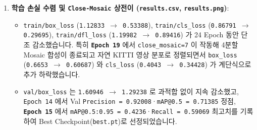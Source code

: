 \documentclass[10.5pt,a4paper]{article}
\begin{document}
\begin{enumerate}[leftmargin=1.8em,itemsep=2pt]
\item \textbf{학습 손실 수렴 및 \texttt{Close-\allowbreak{}Mosaic} 상전이 (\texttt{results.\allowbreak{}csv}, \texttt{results.\allowbreak{}png})}:
\begin{itemize}[leftmargin=1.5em,itemsep=2pt]
\item \texttt{train/\allowbreak{}box\_\allowbreak{}loss} (\texttt{1.\allowbreak{}12833 $\rightarrow$ 0.\allowbreak{}53388}), \texttt{train/\allowbreak{}cls\_\allowbreak{}loss} (\texttt{0.\allowbreak{}86791 $\rightarrow$ 0.\allowbreak{}29695}), \texttt{train/\allowbreak{}dfl\_\allowbreak{}loss} (\texttt{1.\allowbreak{}19982 $\rightarrow$ 0.\allowbreak{}89416}) 가 24 Epoch 동안 단조 감소했습니다. 특히 \textbf{\texttt{Epoch 19}} 에서 \texttt{close\_\allowbreak{}mosaic=7} 이 작동해 4분할 Mosaic 합성이 종료되고 자연 KITTI 영상 분포로 정렬되면서 \texttt{box\_\allowbreak{}loss} (\texttt{0.\allowbreak{}6653 $\rightarrow$ 0.\allowbreak{}60687}) 와 \texttt{cls\_\allowbreak{}loss} (\texttt{0.\allowbreak{}4043 $\rightarrow$ 0.\allowbreak{}34428}) 가 계단식으로 추가 하락했습니다.
\item \texttt{val/\allowbreak{}box\_\allowbreak{}loss} 는 \texttt{1.\allowbreak{}60946 $\rightarrow$ 1.\allowbreak{}29238} 로 과적합 없이 지속 감소했고, \texttt{Epoch 14} 에서 Val \texttt{Precision = 0.\allowbreak{}92008}·\texttt{mAP@0.\allowbreak{}5 = 0.\allowbreak{}71385} 정점, \textbf{\texttt{Epoch 15}} 에서 \texttt{mAP@0.\allowbreak{}5:\allowbreak{}0.\allowbreak{}95 = 0.\allowbreak{}4236}·\texttt{Recall = 0.\allowbreak{}59069} 최고치를 기록하여 Best Checkpoint(\texttt{best.\allowbreak{}pt})로 선정되었습니다.
\end{itemize}
\end{enumerate}
\end{document}
